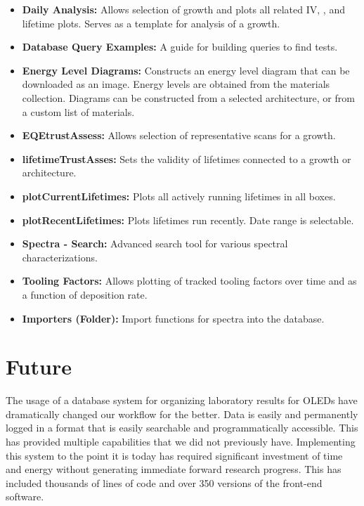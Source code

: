 \documentclass[../thesis.tex]{subfiles}
\begin{document}
\begin{itemize}
\item \textbf{Daily Analysis:} Allows selection of growth and plots all related IV, \eqe, and lifetime plots.  Serves as a template for analysis of a growth.
\item \textbf{Database Query Examples:} A guide for building queries to find tests.
\item \textbf{Energy Level Diagrams:} Constructs an energy level diagram that can be downloaded as an image.  Energy levels are obtained from the materials collection.  Diagrams can be constructed from a selected architecture, or from a custom list of materials.
\item \textbf{EQEtrustAssess:} Allows selection of representative \eqe scans for a growth.
\item \textbf{lifetimeTrustAsses:} Sets the validity of lifetimes connected to a growth or architecture.
\item \textbf{plotCurrentLifetimes:} Plots all actively running lifetimes in all boxes.
\item \textbf{plotRecentLifetimes:} Plots lifetimes run recently.  Date range is selectable.
\item \textbf{Spectra - Search:} Advanced search tool for various spectral characterizations.
\item \textbf{Tooling Factors:} Allows plotting of tracked tooling factors over time and as a function of deposition rate.
\item \textbf{Importers (Folder):} Import functions for spectra into the database.


\end{itemize}

\section{Future}

The usage of a database system for organizing laboratory results for OLEDs have dramatically changed our workflow for the better.
Data is easily and permanently logged in a format that is easily searchable and programmatically accessible.
This has provided multiple capabilities that we did not previously have.
Implementing this system to the point it is today has required significant investment of time and energy without generating immediate forward research progress.
This has included thousands of lines of code and over 350 versions of the front-end software.
\end{document}
